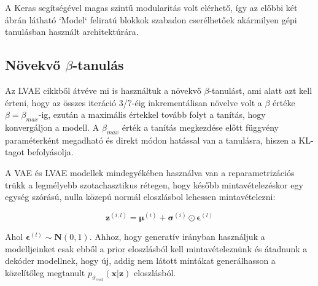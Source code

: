 \documentclass[12pt, english]{article}
\begin{document}
\vspace{4mm}

\par A Keras segítségével magas szintű modularitás volt elérhető, így az előbbi két ábrán látható `Model` feliratú blokkok szabadon cserélhetőek akármilyen gépi tanulásban használt architektúrára. 

\vspace{5mm}

\subsection{Növekvő $\beta$-tanulás}

\vspace{5mm}

\par Az LVAE cikkből \cite{sonderby2016ladder} átvéve mi is használtuk a növekvő $\beta$-tanulást, ami alatt azt kell érteni, hogy az összes iteráció 3/7-éig inkrementálisan növelve volt a $\beta$ értéke $\beta = \beta_{max}$-ig, ezután a maximális értekkel tovább folyt a tanítás, hogy konvergáljon a modell. A $\beta_{max}$ érték a tanítás megkezdése előtt függvény paraméterként megadható és direkt módon hatással van a tanulásra, hiszen a KL-tagot befolyásolja.

\vspace{4mm}

\par A VAE és LVAE modellek mindegyékében használva van a reparametrizációs trükk a legmélyebb szotachasztikus rétegen, hogy később mintavételezéskor egy egység szórású, nulla közepú normál eloszlásbol lehessen mintavételezni:

\vspace{4mm}

\begin{equation}
    \boldsymbol{\bm{z}}^{(i, l)} = \boldsymbol{\mu}^{(i)} + \boldsymbol{\sigma}^{(i)} \odot \boldsymbol{\bm{\epsilon}}^{(l)}
\end{equation}

\vspace{4mm}

\par Ahol $\boldsymbol{\bm{\epsilon}}^{(l)} \sim \boldsymbol{N}(0, 1)$. Ahhoz, hogy generatív irányban használjuk a modelljeinket csak ebből a prior eloszlásból kell mintavételeznünk és átadnunk a dekóder modellnek, hogy új, addig nem látott mintákat generálhasson a közelítőleg megtanult $p_{\vartheta_{real}}(\bm{x} | \bm{z})$ eloszlásból.
\end{document}
